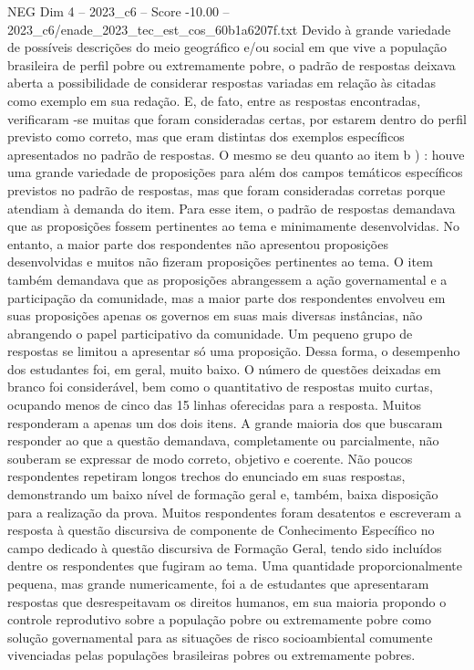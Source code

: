 \begin{textsample}{NEG Dim 4 – 2023\_c6 – Score -10.00 – 2023\_c6/enade\_2023\_tec\_est\_cos\_60b1a6207f.txt}
Devido à grande variedade de possíveis descrições do meio geográfico e/ou social em que vive a população brasileira de perfil pobre ou extremamente pobre, o padrão de respostas deixava aberta a possibilidade de considerar respostas variadas em relação às citadas como exemplo em sua redação.
E, de fato, entre as respostas encontradas, verificaram -se muitas que foram consideradas certas, por estarem dentro do perfil previsto como correto, mas que eram distintas dos exemplos específicos apresentados no padrão de respostas.
O mesmo se deu quanto ao item b ) : houve uma grande variedade de proposições para além dos campos temáticos específicos previstos no padrão de respostas, mas que foram consideradas corretas porque atendiam à demanda do item.
Para esse item, o padrão de respostas demandava que as proposições fossem pertinentes ao tema e minimamente desenvolvidas.
No entanto, a maior parte dos respondentes não apresentou proposições desenvolvidas e muitos não fizeram proposições pertinentes ao tema.
O item também demandava que as proposições abrangessem a ação governamental e a participação da comunidade, mas a maior parte dos respondentes envolveu em suas proposições apenas os governos em suas mais diversas instâncias, não abrangendo o papel participativo da comunidade.
Um pequeno grupo de respostas se limitou a apresentar só uma proposição.
Dessa forma, o desempenho dos estudantes foi, em geral, muito baixo.
O número de questões deixadas em branco foi considerável, bem como o quantitativo de respostas muito curtas, ocupando menos de cinco das 15 linhas oferecidas para a resposta.
Muitos responderam a apenas um dos dois itens.
A grande maioria dos que buscaram responder ao que a questão demandava, completamente ou parcialmente, não souberam se expressar de modo correto, objetivo e coerente.
Não poucos respondentes repetiram longos trechos do enunciado em suas respostas, demonstrando um baixo nível de formação geral e, também, baixa disposição para a realização da prova.
Muitos respondentes foram desatentos e escreveram a resposta à questão discursiva de componente de Conhecimento Específico no campo dedicado à questão discursiva de Formação Geral, tendo sido incluídos dentre os respondentes que fugiram ao tema.
Uma quantidade proporcionalmente pequena, mas grande numericamente, foi a de estudantes que apresentaram respostas que desrespeitavam os direitos humanos, em sua maioria propondo o controle reprodutivo sobre a população pobre ou extremamente pobre como solução governamental para as situações de risco socioambiental comumente vivenciadas pelas populações brasileiras pobres ou extremamente pobres.

\end{textsample}
